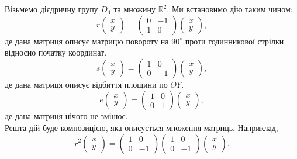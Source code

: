 \documentclass{math_library}
\begin{document}
\begin{example}
Візьмемо дієдричну групу $D_4$ та множину $\mathbb{R}^2$. Ми встановимо дію таким чином:
\[
r \begin{pmatrix}
x \\ y
\end{pmatrix} = \begin{pmatrix}
0 & -1 \\
1 & 0
\end{pmatrix} \begin{pmatrix}
x \\ y
\end{pmatrix},
\]
де дана матриця описує матрицю повороту на $90^\circ$ проти годинникової стрілки відносно початку координат.
\[
s \begin{pmatrix}
x \\ y
\end{pmatrix} = \begin{pmatrix}
1 & 0 \\
0 & -1
\end{pmatrix} \begin{pmatrix}
x \\ y
\end{pmatrix},
\]
де дана матриця описує відбиття площини по $OY$.
\[
e \begin{pmatrix}
x \\ y
\end{pmatrix} = \begin{pmatrix}
1 & 0 \\
0 & 1
\end{pmatrix} \begin{pmatrix}
x \\ y
\end{pmatrix},
\]
де дана матриця нічого не змінює.\\
Решта дій буде композицією, яка описується множення матриць. Наприклад, 
\[
r^2 \begin{pmatrix}
x \\ y
\end{pmatrix} = \begin{pmatrix}
1 & 0 \\
0 & -1
\end{pmatrix} \begin{pmatrix}
1 & 0 \\
0 & -1
\end{pmatrix} \begin{pmatrix}
x \\ y
\end{pmatrix}.
\]
\end{example}
\end{document}
